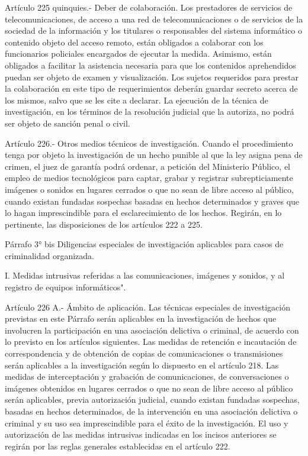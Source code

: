     Artículo 225 quinquies.- Deber de colaboración. Los prestadores de servicios de telecomunicaciones, de acceso a una red de telecomunicaciones o de servicios de la sociedad de la información y los titulares o responsables del sistema informático o contenido objeto del acceso remoto, están obligados a colaborar con los funcionarios policiales encargados de ejecutar la medida. Asimismo, están obligados a facilitar la asistencia necesaria para que los contenidos aprehendidos puedan ser objeto de examen y visualización.
    Los sujetos requeridos para prestar la colaboración en este tipo de requerimientos deberán guardar secreto acerca de los mismos, salvo que se les cite a declarar. La ejecución de la técnica de investigación, en los términos de la resolución judicial que la autoriza, no podrá ser objeto de sanción penal o civil.

    Artículo 226.- Otros medios técnicos de investigación. Cuando el procedimiento tenga por objeto la investigación de un hecho punible al que la ley asigna pena de crimen, el juez de garantía podrá ordenar, a petición del Ministerio Público, el empleo de medios tecnológicos para captar, grabar y registrar subrepticiamente imágenes o sonidos en lugares cerrados o que no sean de libre acceso al público, cuando existan fundadas sospechas basadas en hechos determinados y graves que lo hagan imprescindible para el esclarecimiento de los hechos. Regirán, en lo pertinente, las disposiciones de los artículos 222 a 225.


    Párrafo 3° bis Diligencias especiales de investigación aplicables para casos de criminalidad organizada.


    I. Medidas intrusivas referidas a las comunicaciones, imágenes y sonidos, y al registro de equipos informáticos".

    Artículo 226 A.- Ámbito de aplicación. Las técnicas especiales de investigación previstas en este Párrafo serán aplicables en la investigación de hechos que involucren la participación en una asociación delictiva o criminal, de acuerdo con lo previsto en los artículos siguientes.
    Las medidas de retención e incautación de correspondencia y de obtención de copias de comunicaciones o transmisiones serán aplicables a la investigación según lo dispuesto en el artículo 218.
    Las medidas de interceptación y grabación de comunicaciones, de conversaciones o imágenes obtenidos en lugares cerrados o que no sean de libre acceso al público serán aplicables, previa autorización judicial, cuando existan fundadas sospechas, basadas en hechos determinados, de la intervención en una asociación delictiva o criminal y su uso sea imprescindible para el éxito de la investigación.
    El uso y autorización de las medidas intrusivas indicadas en los incisos anteriores se regirán por las reglas generales establecidas en el artículo 222.







